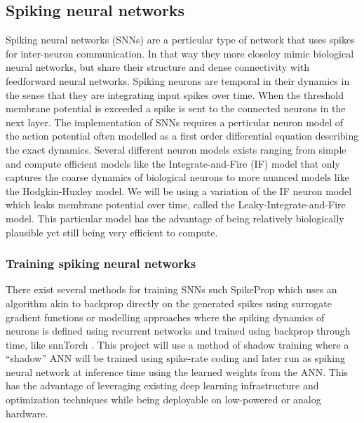 \documentclass[a4paper,11pt]{article} %
\begin{document}



\subsection{Spiking neural networks}
Spiking neural networks (SNNs) are a perticular type of network that uses spikes for inter-neuron communication. In that way they more closeley mimic biological neural networks, but share their structure and dense connectivity with feedforward neural networks. Spiking neurons are temporal in their dynamics in the sense that they are integrating input spikes over time. When the threshold membrane potential is exceeded a spike is sent to the connected neurons in the next layer. The implementation of SNNs requires a perticular neuron model of the action potential often modelled as a first order differential equation describing the exact dynamics. Several different neuron models exists ranging from simple and compute efficient models like the Integrate-and-Fire (IF) model that only captures the coarse dynamics of biological neurons to more nuanced models like the Hodgkin-Huxley model. We will be using a variation of the IF neuron model which leaks membrane potential over time, called the Leaky-Integrate-and-Fire model. This particular model has the advantage of being relatively biologically plausible yet still being very efficient to compute. 

\subsubsection{Training spiking neural networks}
There exist several methods for training SNNs such SpikeProp \cite{Boht2000SpikePropBF} which uses an algorithm akin to backprop directly on the generated spikes using surrogate gradient functions or modelling approaches where the spiking dynamics of neurons is defined using recurrent networks and trained using backprop through time, like snnTorch \cite{eshraghian2021training}. This project will use a method of shadow training where a ``shadow'' ANN will be trained using spike-rate coding and later run as spiking neural network at inference time using the learned weights from the ANN. This has the advantage of leveraging existing deep learning infrastructure and optimization techniques while being deployable on low-powered or analog hardware. 
\end{document}
